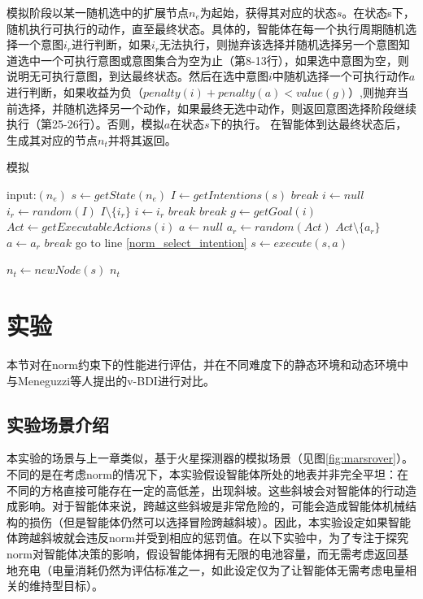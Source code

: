 模拟阶段以某一随机选中的扩展节点$n_e$为起始，获得其对应的状态$s$。在状态s下，随机执行可执行的动作，直至最终状态。具体的，智能体在每一个执行周期随机选择一个意图$i_r$进行判断，如果$i_r$无法执行，则抛弃该选择并随机选择另一个意图知道选中一个可执行意图或意图集合为空为止（第8-13行），如果选中意图为空，则说明无可执行意图，到达最终状态。然后在选中意图$i$中随机选择一个可执行动作$a$进行判断，如果收益为负（$penalty(i)+penalty(a) < value(g)$）,则抛弃当前选择，并随机选择另一个动作，如果最终无选中动作，则返回意图选择阶段继续执行（第25-26行）。否则，模拟$a$在状态$s$下的执行。 在智能体到达最终状态后，生成其对应的节点$n_t$并将其返回。

\begin{algorithm}[H]
\caption{模拟}\label{norm_simulate}
\begin{algorithmic}[1]
\STATE input:$(n_e)$
\STATE $s \gets getState(n_e)$
  \STATE $I \gets getIntentions(s)$
    \STATE $break$
  \ENDIF
  \STATE $i \gets null$\label{norm_select_intention}
    \STATE $i_r \gets random(I)$
    \STATE $I \setminus \{i_r\}$
      \STATE $i \gets i_r$
      \STATE $break$
    \ENDIF
  \ENDWHILE
    \STATE $break$
  \ENDIF
  \STATE $g \gets getGoal(i)$
  \STATE $Act \gets getExecutableActions(i)$
  \STATE $a \gets null$
    \STATE $a_r \gets random(Act)$
    \STATE $Act \setminus \{a_r\}$
      \STATE $a \gets a_r$
      \STATE $break$
    \ENDIF
  \ENDWHILE
    \STATE go to line \ref{norm_select_intention}
  \ENDIF
  \STATE $s \gets execute(s, a)$
\ENDWHILE

\STATE $n_t \gets newNode(s)$
\RETURN $n_t$
\end{algorithmic}
\end{algorithm}

\section{实验}
本节对\SAN 在norm约束下的性能进行评估，并在不同难度下的静态环境和动态环境中与Meneguzzi等人\cite{DBLP:journals/eaai/MeneguzziROVL15}提出的v-BDI进行对比。
\subsection{实验场景介绍}
本实验的场景与上一章类似，基于火星探测器的模拟场景（见图\ref{fig:marsrover}）。不同的是在考虑norm的情况下，本实验假设智能体所处的地表并非完全平坦：在不同的方格直接可能存在一定的高低差，出现斜坡。这些斜坡会对智能体的行动造成影响。对于智能体来说，跨越这些斜坡是非常危险的，可能会造成智能体机械结构的损伤（但是智能体仍然可以选择冒险跨越斜坡）。因此，本实验设定如果智能体跨越斜坡就会违反norm并受到相应的惩罚值。在以下实验中，为了专注于探究norm对智能体决策的影响，假设智能体拥有无限的电池容量，而无需考虑返回基地充电（电量消耗仍然为评估标准之一，如此设定仅为了让智能体无需考虑电量相关的维持型目标）。

